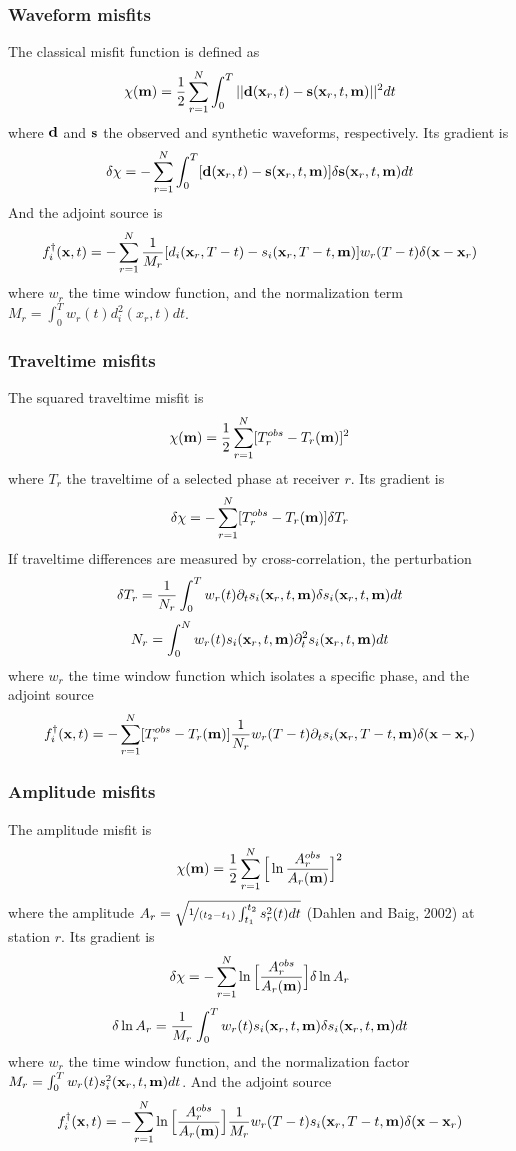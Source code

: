 \subsubsection{Waveform misfits}
The classical misfit function is defined as
\[ \chi(\mathbf{m})=\frac{1}{2}\sum_{r=1}^N\int_0^T||\mathbf{d}(\mathbf{x}_r,t)-\mathbf{s}(\mathbf{x}_r,t,\mathbf{m})||^2dt \]
where $\mathbf{d}$ and $\mathbf{s}$ the observed and synthetic waveforms, respectively. Its gradient is
\[ \delta\chi=-\sum_{r=1}^N\int_0^T[\mathbf{d}(\mathbf{x}_r,t)-\mathbf{s}(\mathbf{x}_r,t,\mathbf{m})]\delta\mathbf{s}(\mathbf{x}_r,t,\mathbf{m})dt \]
And the adjoint source is
\[ f_i^\dagger(\mathbf{x},t)=-\sum_{r=1}^N\frac{1}{M_r}[d_i(\mathbf{x}_r,T-t)-s_i(\mathbf{x}_r,T-t,\mathbf{m})]w_r(T-t)\delta(\mathbf{x}-\mathbf{x}_r) \]
where $w_r$ the time window function, and the normalization term $M_r=\int_0^Tw_r(t)d_i^2(x_r,t)dt$.\par
\subsubsection{Traveltime misfits}
The squared traveltime misfit is
\[ \chi(\mathbf{m})=\frac{1}{2}\sum_{r=1}^N[T_r^{obs}-T_r(\mathbf{m})]^2 \]
where $T_r$ the traveltime of a selected phase at receiver $r$. Its gradient is
\[ \delta\chi=-\sum_{r=1}^N[T_r^{obs}-T_r(\mathbf{m})]\delta T_r \]
If traveltime differences are measured by cross-correlation, the perturbation
\[ \delta T_r=\frac{1}{N_r}\int_0^Tw_r(t)\partial_ts_i(\mathbf{x}_r,t,\mathbf{m})\delta s_i(\mathbf{x}_r,t,\mathbf{m})dt \]
\[ N_r=\int_0^Nw_r(t)s_i(\mathbf{x}_r,t,\mathbf{m})\partial_t^2s_i(\mathbf{x}_r,t,\mathbf{m})dt \]
where $w_r$ the time window function which isolates a specific phase, and the adjoint source
\[ f_i^\dagger(\mathbf{x},t)=-\sum_{r=1}^N[T_r^{obs}-T_r(\mathbf{m})]\frac{1}{N_r}w_r(T-t)\partial_ts_i(\mathbf{x}_r,T-t,\mathbf{m})\delta(\mathbf{x}-\mathbf{x}_r) \]\par
\subsubsection{Amplitude misfits}
The amplitude misfit is
\[ \chi(\mathbf{m})=\frac{1}{2}\sum_{r=1}^N\Big[\ln\frac{A_r^{obs}}{A_r(\mathbf{m})}\Big]^2 \]
where the amplitude $A_r=\sqrt{\nicefrac{1}{(t_2-t_1)}\int_{t_1}^{t_2}s_r^2(t)dt}$ (Dahlen and Baig, 2002) at station $r$. Its gradient is
\[ \delta\chi=-\sum_{r=1}^N\ln\Big[\frac{A_r^{obs}}{A_r(\mathbf{m})}\Big]\delta\ln A_r \]
\[ \delta\ln A_r=\frac{1}{M_r}\int_0^Tw_r(t)s_i(\mathbf{x}_r,t,\mathbf{m})\delta s_i(\mathbf{x}_r,t,\mathbf{m})dt \]
where $w_r$ the time window function, and the normalization factor $M_r=\int_0^Tw_r(t)s_i^2(\mathbf{x}_r,t,\mathbf{m})dt$. And the adjoint source
\[ f_i^\dagger(\mathbf{x},t)=-\sum_{r=1}^N\ln\Big[\frac{A_r^{obs}}{A_r(\mathbf{m})}\Big]\frac{1}{M_r}w_r(T-t)s_i(\mathbf{x}_r,T-t,\mathbf{m})\delta(\mathbf{x}-\mathbf{x}_r) \]\par
